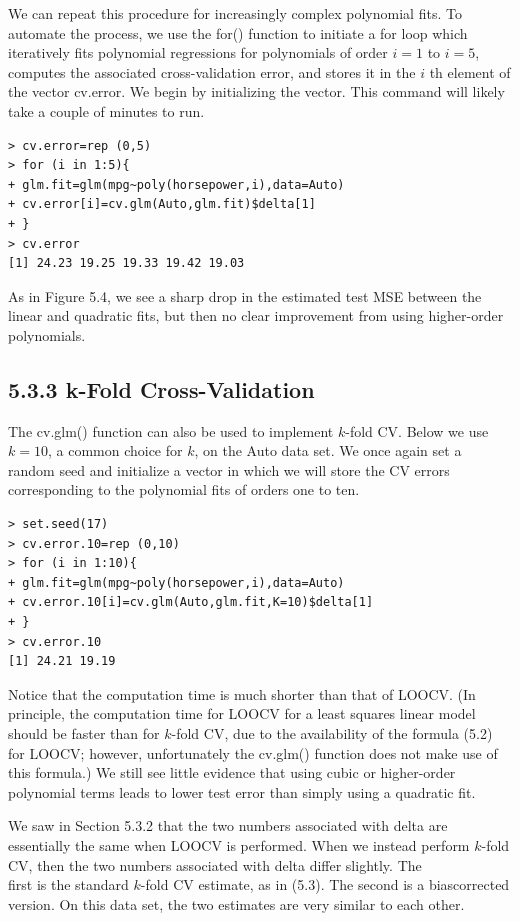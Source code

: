 \documentclass[10pt]{article}
\begin{document}
We can repeat this procedure for increasingly complex polynomial fits. To automate the process, we use the for() function to initiate a for loop which iteratively fits polynomial regressions for polynomials of order $i=1$ to $i=5$, computes the associated cross-validation error, and stores it in the $i$ th element of the vector cv.error. We begin by initializing the vector. This command will likely take a couple of minutes to run.

\begin{verbatim}
> cv.error=rep (0,5)
> for (i in 1:5){
+ glm.fit=glm(mpg~poly(horsepower,i),data=Auto)
+ cv.error[i]=cv.glm(Auto,glm.fit)$delta[1]
+ }
> cv.error
[1] 24.23 19.25 19.33 19.42 19.03
\end{verbatim}

As in Figure 5.4, we see a sharp drop in the estimated test MSE between the linear and quadratic fits, but then no clear improvement from using higher-order polynomials.

\subsection*{5.3.3 k-Fold Cross-Validation}
The cv.glm() function can also be used to implement $k$-fold CV. Below we use $k=10$, a common choice for $k$, on the Auto data set. We once again set a random seed and initialize a vector in which we will store the CV errors corresponding to the polynomial fits of orders one to ten.

\begin{verbatim}
> set.seed(17)
> cv.error.10=rep (0,10)
> for (i in 1:10){
+ glm.fit=glm(mpg~poly(horsepower,i),data=Auto)
+ cv.error.10[i]=cv.glm(Auto,glm.fit,K=10)$delta[1]
+ }
> cv.error.10
[1] 24.21 19.19
\end{verbatim}

Notice that the computation time is much shorter than that of LOOCV. (In principle, the computation time for LOOCV for a least squares linear model should be faster than for $k$-fold CV, due to the availability of the formula (5.2) for LOOCV; however, unfortunately the cv.glm() function does not make use of this formula.) We still see little evidence that using cubic or higher-order polynomial terms leads to lower test error than simply using a quadratic fit.

We saw in Section 5.3.2 that the two numbers associated with delta are essentially the same when LOOCV is performed. When we instead perform $k$-fold CV, then the two numbers associated with delta differ slightly. The\\
first is the standard $k$-fold CV estimate, as in (5.3). The second is a biascorrected version. On this data set, the two estimates are very similar to each other.
\end{document}
